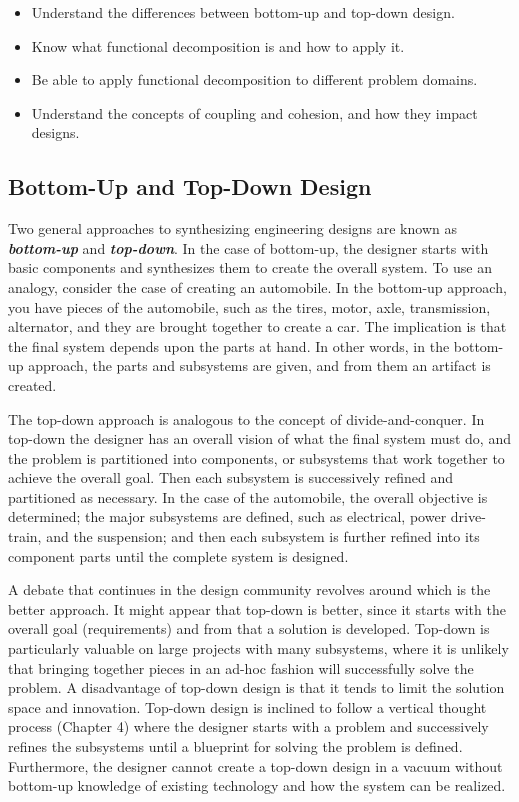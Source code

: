 \begin{itemize}
\item
  Understand the differences between bottom-up and top-down design.
\item
  Know what functional decomposition is and how to apply it.
\item
  Be able to apply functional decomposition to different problem
  domains.
\item
  Understand the concepts of coupling and cohesion, and how they impact
  designs.
\end{itemize}

\subsection{Bottom-Up and Top-Down
Design}\label{bottom-up-and-top-down-design}

Two general approaches to synthesizing engineering designs are known as
\emph{\textbf{bottom-up}} and \emph{\textbf{top-down}}. In the case of
bottom-up, the designer starts with basic components and synthe­sizes
them to create the overall system. To use an analogy, consider the case
of creating an automobile. In the bottom-up approach, you have pieces of
the automobile, such as the tires, motor, axle, transmission,
alternator, and they are brought together to create a car. The
impli­cation is that the final system depends upon the parts at hand. In
other words, in the bottom-up approach, the parts and subsystems are
given, and from them an artifact is created.

The top-down approach is analogous to the concept of divide-and-conquer.
In top-down the designer has an overall vision of what the final system
must do, and the problem is parti­tioned into components, or subsystems
that work together to achieve the overall goal. Then each subsystem is
successively refined and partitioned as necessary. In the case of the
auto­mobile, the overall objective is determined; the major subsystems
are defined, such as electri­cal, power drive-train, and the suspension;
and then each subsystem is further refined into its component parts
until the complete system is designed.

A debate that continues in the design community revolves around which is
the better ap­proach. It might appear that top-down is better, since it
starts with the over­all goal (requirements) and from that a solution is
developed. Top-down is particularly valu­able on large projects with many
subsystems, where it is unlikely that bringing together pieces in an
ad-hoc fashion will successfully solve the problem. A disadvantage of
top-down design is that it tends to limit the solution space and
innovation. Top-down design is inclined to follow a vertical thought
process (Chapter 4) where the designer starts with a problem and
succes­sively refines the subsystems until a blueprint for solving the
problem is defined. Further­more, the designer cannot create a top-down
design in a vacuum without bottom-up knowl­edge of existing technology
and how the system can be realized.

